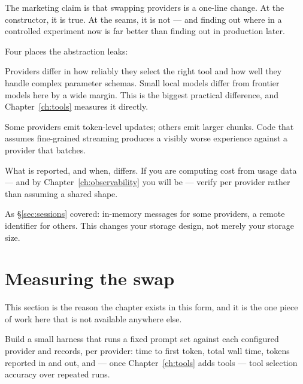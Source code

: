 The marketing claim is that swapping providers is a one-line change. At the
constructor, it is true. At the seams, it is not --- and finding out where in a
controlled experiment now is far better than finding out in production later.

Four places the abstraction leaks:

\begin{description}[leftmargin=0pt, style=nextline]
\item[Tool-calling fidelity.] Providers differ in how reliably they select the
right tool and how well they handle complex parameter schemas. Small local models
differ from frontier models here by a wide margin. This is the biggest practical
difference, and Chapter~\ref{ch:tools} measures it directly.

\item[Streaming granularity.] Some providers emit token-level updates; others
emit larger chunks. Code that assumes fine-grained streaming produces a visibly
worse experience against a provider that batches.

\item[Token accounting.] What is reported, and when, differs. If you are
computing cost from usage data --- and by Chapter~\ref{ch:observability} you will
be --- verify per provider rather than assuming a shared shape.

\item[Session persistence semantics.] As \S\ref{sec:sessions} covered: in-memory
messages for some providers, a remote identifier for others. This changes your
storage design, not merely your storage size.
\end{description}

\section{Measuring the swap}
\label{sec:measure}

This section is the reason the chapter exists in this form, and it is the one
piece of work here that is not available anywhere else.

Build a small harness that runs a fixed prompt set against each configured
provider and records, per provider: time to first token, total wall time, tokens
reported in and out, and --- once Chapter~\ref{ch:tools} adds tools --- tool
selection accuracy over repeated runs.

